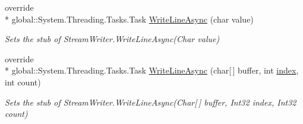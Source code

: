 \begin{DoxyCompactItemize}
override \\*
global\-::\-System.\-Threading.\-Tasks.\-Task \hyperlink{class_system_1_1_i_o_1_1_fakes_1_1_stub_stream_writer_a8d6d0ac4e9e983ef9e1c3e86c2356e27}{Write\-Line\-Async} (char value)
\begin{DoxyCompactList}\small\item\em Sets the stub of Stream\-Writer.\-Write\-Line\-Async(\-Char value)\end{DoxyCompactList}\item 
override \\*
global\-::\-System.\-Threading.\-Tasks.\-Task \hyperlink{class_system_1_1_i_o_1_1_fakes_1_1_stub_stream_writer_a87f9b68e27f88866e1a017b51c8b8345}{Write\-Line\-Async} (char\mbox{[}$\,$\mbox{]} buffer, int \hyperlink{jquery-1_810_82-vsdoc_8js_a75bb12d1f23302a9eea93a6d89d0193e}{index}, int count)
\begin{DoxyCompactList}\small\item\em Sets the stub of Stream\-Writer.\-Write\-Line\-Async(\-Char\mbox{[}$\,$\mbox{]} buffer, Int32 index, Int32 count)\end{DoxyCompactList}\end{DoxyCompactItemize}
